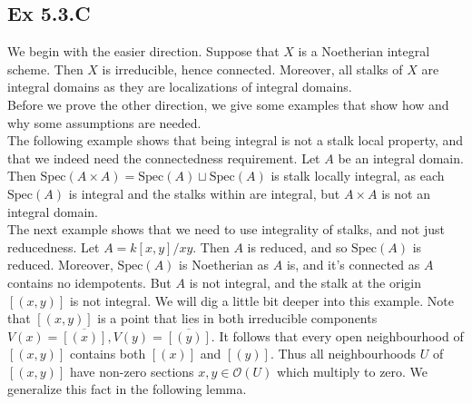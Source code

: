 \documentclass{article}
\theoremstyle{definition}
\newcommand{\oo}{\mathcal{O}}
\newcommand{\Spec}{\text{Spec}}
\begin{document}
\subsection*{Ex 5.3.C}

We begin with the easier direction. Suppose that $X$ is a Noetherian integral
scheme. Then $X$ is irreducible, hence connected. Moreover, all stalks of $X$
are integral domains as they are localizations of integral domains. \\

Before we prove the other direction, we give some examples that show how and 
why some assumptions are needed. \\

The following example shows that being integral is not a stalk local property,
and that we indeed need the connectedness requirement. Let $A$ be an integral
domain. Then $\Spec(A \times A) = \Spec(A) \sqcup \Spec(A)$ is stalk locally
integral, as each $\Spec(A)$ is integral and the stalks within are integral,
but $A \times A$ is not an integral domain. \\

The next example shows that we need to use integrality of stalks, and not just
reducedness. Let $A = k[x, y]/xy$. Then $A$ is reduced, and so $\Spec(A)$ is
reduced. Moreover, $\Spec(A)$ is Noetherian as $A$ is, and it's connected as
$A$ contains no idempotents. But $A$ is not integral, and the stalk at the
origin $[(x, y)]$ is not integral. We will dig a little bit deeper into this
example. Note that $[(x, y)]$ is a point that lies in both irreducible
components $V(x) = \overline{[(x)]}, V(y) = \overline{[(y)]}$. It follows that
every open neighbourhood of $[(x, y)]$ contains both $[(x)]$ and $[(y)]$. Thus
all neighbourhoods $U$ of $[(x, y)]$ have non-zero sections $x, y \in \oo(U)$
which multiply to zero. We generalize this fact in the following lemma.
\end{document}
